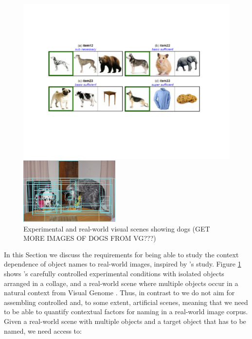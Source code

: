 \documentclass[runningheads]{llncs}
\begin{document}
\begin{figure}[t]
	\begin{center}
		\begin{minipage}{.52\textwidth}
			\includegraphics[width=\linewidth]{fig/graffig.pdf}
		\end{minipage}
		\begin{minipage}{.42\textwidth}
			\includegraphics[width=5cm]{fig/visual_genome_dogs.png}
		\end{minipage}
	\end{center}
	\caption{Experimental and real-world visual scenes showing dogs (GET MORE IMAGES OF DOGS FROM VG???)}
	\label{fig:graf_genome}
\end{figure}

In this Section we discuss the requirements for  being able to study the context dependence of object names to real-world images, inspired by \cite{graf2016animal}'s study.
 Figure \ref{fig:graf_genome} shows  \cite{graf2016animal}'s carefully controlled experimental conditions with isolated objects arranged in a collage, and a real-world scene where multiple objects occur in a natural context from Visual Genome \cite{krishna2016visualgenome}.
Thus, in contrast to \cite{graf2016animal} we do not aim for assembling controlled and, to some extent, artificial scenes, meaning that we need to be able to quantify contextual factors for naming in a real-world image corpus. 
Given a real-world scene with multiple objects and a target object that has to be named, we need access to:
\end{document}
